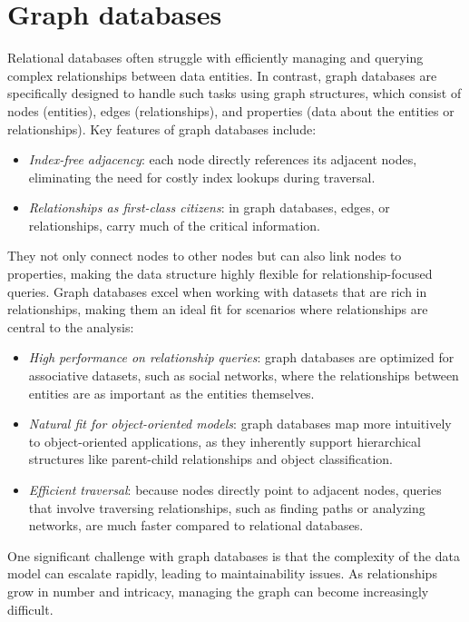 \section{Graph databases}

Relational databases often struggle with efficiently managing and querying complex relationships between data entities. 
In contrast, graph databases are specifically designed to handle such tasks using graph structures, which consist of nodes (entities), edges (relationships), and properties (data about the entities or relationships).
Key features of graph databases include:
\begin{itemize}
    \item \textit{Index-free adjacency}: each node directly references its adjacent nodes, eliminating the need for costly index lookups during traversal.
    \item \textit{Relationships as first-class citizens}: in graph databases, edges, or relationships, carry much of the critical information. 
\end{itemize}
They not only connect nodes to other nodes but can also link nodes to properties, making the data structure highly flexible for relationship-focused queries.
Graph databases excel when working with datasets that are rich in relationships, making them an ideal fit for scenarios where relationships are central to the analysis:
\begin{itemize}
    \item \textit{High performance on relationship queries}: graph databases are optimized for associative datasets, such as social networks, where the relationships between entities are as important as the entities themselves.
    \item \textit{Natural fit for object-oriented models}: graph databases map more intuitively to object-oriented applications, as they inherently support hierarchical structures like parent-child relationships and object classification.
    \item \textit{Efficient traversal}: because nodes directly point to adjacent nodes, queries that involve traversing relationships, such as finding paths or analyzing networks, are much faster compared to relational databases.
\end{itemize}
One significant challenge with graph databases is that the complexity of the data model can escalate rapidly, leading to maintainability issues. 
As relationships grow in number and intricacy, managing the graph can become increasingly difficult.

